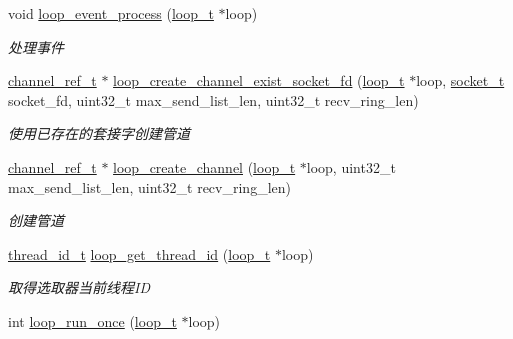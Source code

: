 \begin{DoxyCompactItemize}
void \hyperlink{a00069_a94a2dfa4ba7723d7face3f76ebf31e54_a94a2dfa4ba7723d7face3f76ebf31e54}{loop\+\_\+event\+\_\+process} (\hyperlink{a00051_a9c3ad1cd2de83e09f3a7b59fa82c94ee_a9c3ad1cd2de83e09f3a7b59fa82c94ee}{loop\+\_\+t} $\ast$loop)
\begin{DoxyCompactList}\small\item\em 处理事件 \end{DoxyCompactList}\item 
\hyperlink{a00051_a151271c9d188ef28d4d24bb81dcc1263_a151271c9d188ef28d4d24bb81dcc1263}{channel\+\_\+ref\+\_\+t} $\ast$ \hyperlink{a00105_ga6879ac453ef83768ce8f8ef43a474409_ga6879ac453ef83768ce8f8ef43a474409}{loop\+\_\+create\+\_\+channel\+\_\+exist\+\_\+socket\+\_\+fd} (\hyperlink{a00051_a9c3ad1cd2de83e09f3a7b59fa82c94ee_a9c3ad1cd2de83e09f3a7b59fa82c94ee}{loop\+\_\+t} $\ast$loop, \hyperlink{a00051_a0d9e0afbf02fb6ed6c5b1415dce51b05_a0d9e0afbf02fb6ed6c5b1415dce51b05}{socket\+\_\+t} socket\+\_\+fd, uint32\+\_\+t max\+\_\+send\+\_\+list\+\_\+len, uint32\+\_\+t recv\+\_\+ring\+\_\+len)
\begin{DoxyCompactList}\small\item\em 使用已存在的套接字创建管道 \end{DoxyCompactList}\item 
\hyperlink{a00051_a151271c9d188ef28d4d24bb81dcc1263_a151271c9d188ef28d4d24bb81dcc1263}{channel\+\_\+ref\+\_\+t} $\ast$ \hyperlink{a00105_gab5b73ea9a0347b431f93ebf30ecd05b5_gab5b73ea9a0347b431f93ebf30ecd05b5}{loop\+\_\+create\+\_\+channel} (\hyperlink{a00051_a9c3ad1cd2de83e09f3a7b59fa82c94ee_a9c3ad1cd2de83e09f3a7b59fa82c94ee}{loop\+\_\+t} $\ast$loop, uint32\+\_\+t max\+\_\+send\+\_\+list\+\_\+len, uint32\+\_\+t recv\+\_\+ring\+\_\+len)
\begin{DoxyCompactList}\small\item\em 创建管道 \end{DoxyCompactList}\item 
\hyperlink{a00051_ad0ada5642d10ce71bdd90816182f9b79_ad0ada5642d10ce71bdd90816182f9b79}{thread\+\_\+id\+\_\+t} \hyperlink{a00069_a1a9b3ef7cb2655dbabeabeeae2f8f299_a1a9b3ef7cb2655dbabeabeeae2f8f299}{loop\+\_\+get\+\_\+thread\+\_\+id} (\hyperlink{a00051_a9c3ad1cd2de83e09f3a7b59fa82c94ee_a9c3ad1cd2de83e09f3a7b59fa82c94ee}{loop\+\_\+t} $\ast$loop)
\begin{DoxyCompactList}\small\item\em 取得选取器当前线程\+I\+D \end{DoxyCompactList}\item 
int \hyperlink{a00105_ga2f1994d76e46cf4855ac955ccd41d9ef_ga2f1994d76e46cf4855ac955ccd41d9ef}{loop\+\_\+run\+\_\+once} (\hyperlink{a00051_a9c3ad1cd2de83e09f3a7b59fa82c94ee_a9c3ad1cd2de83e09f3a7b59fa82c94ee}{loop\+\_\+t} $\ast$loop)

\end{DoxyCompactItemize}

